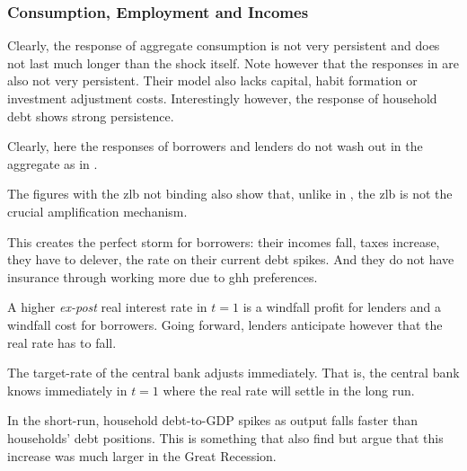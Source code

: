 \documentclass[12pt]{article} %
\numberwithin{equation}{section} %
\numberwithin{figure}{section}
\numberwithin{table}{section}
\begin{document}
\subsubsection{Consumption, Employment and Incomes}


Clearly, the response of aggregate consumption is not very persistent and does not last much longer than the shock itself. Note however that the responses in \textcite{gl2017} are also not very persistent. Their model also lacks capital, habit formation or investment adjustment costs. Interestingly however, the response of household debt shows strong persistence. 


Clearly, here the responses of borrowers and lenders do not wash out in the aggregate as in \textcite{justiniano2015}.

The figures with the \Gls{zlb} not binding also show that, unlike in \textcite{egg2012}, the \Gls{zlb} is not the crucial amplification mechanism.

This creates the perfect storm for borrowers: their incomes fall, taxes increase, they have to delever, the rate on their current debt spikes. And they do not have insurance through working more due to \Gls{ghh} preferences.

A higher \textit{ex-post} real interest rate in $t=1$ is a windfall profit for lenders and a windfall cost for borrowers. Going forward, lenders anticipate however that the real rate has to fall.

The target-rate of the central bank adjusts immediately. That is, the central bank knows immediately in $t=1$ where the real rate will settle in the long run.

In the short-run, household debt-to-GDP spikes as output falls faster than households' debt positions. This is something that \textcite{justiniano2015} also find but argue that this increase was much larger in the Great Recession. 
\end{document}
